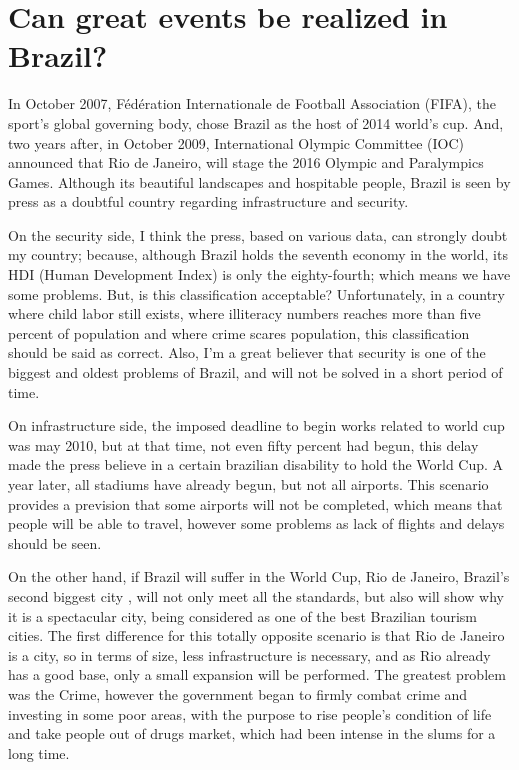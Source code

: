 \documentclass[a4paper,12pt]{article}
\begin{document}
\titleTMB 
\newpage
{} %

\section{Can great events be realized in Brazil?}


In October 2007, Fédération Internationale de Football Association (FIFA), the
sport's global governing body, chose Brazil as the host of 2014 world's cup.
And, two years after, in October 2009, International Olympic Committee (IOC)
announced  that Rio de Janeiro,  will stage  the 2016  Olympic  and Paralympics
Games.  
Although its beautiful landscapes and hospitable people,
Brazil  is seen  by press  as a  doubtful country  regarding  infrastructure and
security.

On the security side, I think the press, based on various data, can strongly doubt my country;
because, although Brazil holds the seventh economy in the world, its HDI (Human
Development Index) is only the eighty-fourth; which means we have some problems.
But, is this  classification acceptable? Unfortunately, in a  country where child
labor still exists, where illiteracy numbers
reaches more  than five percent of  population and  where crime scares
population, this  classification should  be said as  correct. Also, I'm  a great
believer that security is one of  the biggest and oldest problems of Brazil, and
will not be solved in a short period of time.


On infrastructure side, the imposed deadline to begin works related to
world cup was may 2010, but at that time, not even fifty percent had begun, this
delay made the press believe in a certain brazilian disability to hold the World
Cup. A year later, all stadiums have already begun, but not all airports. 
This scenario  provides a  prevision that some  airports will not  be completed,
which means that people will be able to travel, however some problems as lack of
flights and delays should be seen.

On the  other hand,  if Brazil  will suffer in  the World  Cup, Rio  de Janeiro,
Brazil's second  biggest city , will not  only meet all the  standards, but also
will show why it is a spectacular city, being considered as one of the best Brazilian tourism cities.
The first  difference for this totally opposite scenario is that Rio de
Janeiro is a city, so in terms of size, less infrastructure is necessary, and
as Rio already has  a good base, only a small expansion  will be performed.  The
greatest problem  was the Crime, however  the government began  to firmly combat
crime  and investing  in some  poor  areas, with  the purpose  to rise  people's
condition of life and take people out of drugs market, which had been intense in the slums for a long time.
\end{document}
